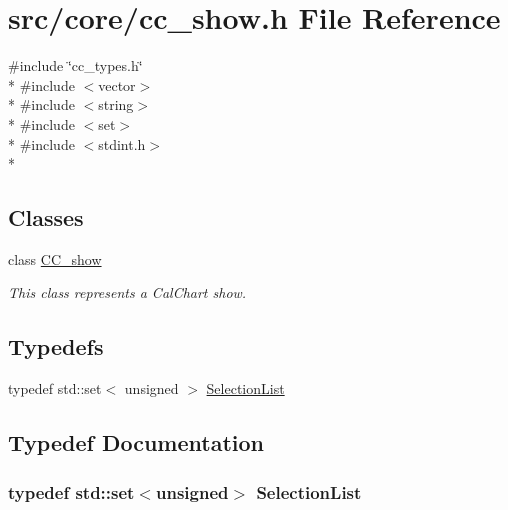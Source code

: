 \hypertarget{a00214}{\section{src/core/cc\-\_\-show.h File Reference}
\label{a00214}
}
{\ttfamily \#include \char`\"{}cc\-\_\-types.\-h\char`\"{}}\\*
{\ttfamily \#include $<$vector$>$}\\*
{\ttfamily \#include $<$string$>$}\\*
{\ttfamily \#include $<$set$>$}\\*
{\ttfamily \#include $<$stdint.\-h$>$}\\*
\subsection*{Classes}
\begin{DoxyCompactItemize}
\item 
class \hyperlink{a00046}{C\-C\-\_\-show}
\begin{DoxyCompactList}\small\item\em This class represents a Cal\-Chart show. \end{DoxyCompactList}\end{DoxyCompactItemize}
\subsection*{Typedefs}
\begin{DoxyCompactItemize}
\item 
typedef std\-::set$<$ unsigned $>$ \hyperlink{a00214_aaec86d4bb87e1e6f0b60e6e551c5e570}{Selection\-List}
\end{DoxyCompactItemize}


\subsection{Typedef Documentation}
\hypertarget{a00214_aaec86d4bb87e1e6f0b60e6e551c5e570}{
\subsubsection[{Selection\-List}]{\setlength{\rightskip}{0pt plus 5cm}typedef std\-::set$<$unsigned$>$ {\bf Selection\-List}}}\label{a00214_aaec86d4bb87e1e6f0b60e6e551c5e570}

